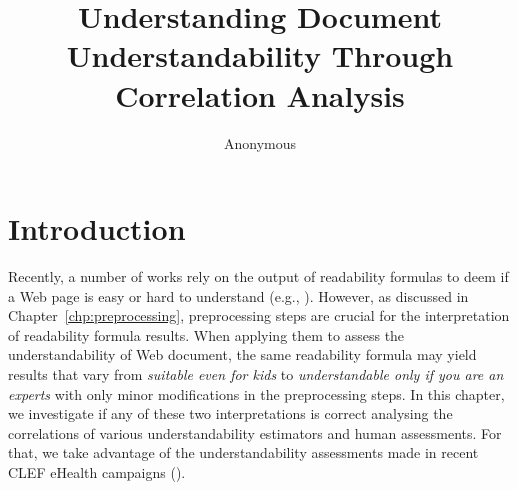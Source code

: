 \documentclass[runningheads,a4paper]{llncs}
\begin{document}
\mainmatter  %

\title{Understanding Document Understandability Through Correlation Analysis}


%
%
\author{Anonymous}
%


%
%

\maketitle


\section{Introduction}
\label{chp:understanding_understandability}

Recently, a number of works rely on the output of readability formulas to deem if a Web page is easy or hard to understand (e.g., \cite{graber99readability,fitzsimmons2010readability,wiener2013readability,patel13readability,atcherson14readability,meillier17readability}).
However, as discussed in Chapter~\ref{chp:preprocessing}, preprocessing steps are crucial for the interpretation of readability formula results. When applying them to assess the understandability of Web   document, the same readability formula may yield results that vary from \textit{suitable even for kids} to \textit{understandable only if you are an experts} with only minor modifications in the preprocessing steps.
In this chapter, we investigate if any of these two interpretations is correct analysing the correlations of various understandability estimators and human assessments.
For that, we take advantage of the understandability assessments made in recent CLEF eHealth campaigns (\cite{clef15,clef16}).
\end{document}

